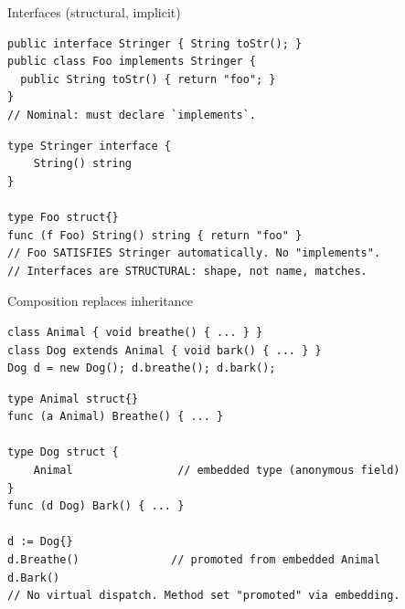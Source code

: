 \documentclass[10pt]{article}
\begin{document}
\begin{construct}{Interfaces (structural, implicit)}
\noindent
\begin{minipage}[t]{0.485\linewidth}
\begin{lstlisting}[style=java, title=Java]
public interface Stringer { String toStr(); }
public class Foo implements Stringer {
  public String toStr() { return "foo"; }
}
// Nominal: must declare `implements`.
\end{lstlisting}
\end{minipage}\hfill
\begin{minipage}[t]{0.485\linewidth}
\begin{lstlisting}[style=go, title=Go]
type Stringer interface {
    String() string
}

type Foo struct{}
func (f Foo) String() string { return "foo" }
// Foo SATISFIES Stringer automatically. No "implements".
// Interfaces are STRUCTURAL: shape, not name, matches.
\end{lstlisting}
\end{minipage}
\end{construct}

\begin{construct}{Composition replaces inheritance}
\noindent
\begin{minipage}[t]{0.485\linewidth}
\begin{lstlisting}[style=java, title=Java]
class Animal { void breathe() { ... } }
class Dog extends Animal { void bark() { ... } }
Dog d = new Dog(); d.breathe(); d.bark();
\end{lstlisting}
\end{minipage}\hfill
\begin{minipage}[t]{0.485\linewidth}
\begin{lstlisting}[style=go, title=Go]
type Animal struct{}
func (a Animal) Breathe() { ... }

type Dog struct {
    Animal                // embedded type (anonymous field)
}
func (d Dog) Bark() { ... }

d := Dog{}
d.Breathe()              // promoted from embedded Animal
d.Bark()
// No virtual dispatch. Method set "promoted" via embedding.
\end{lstlisting}
\end{minipage}
\end{construct}

\end{document}
